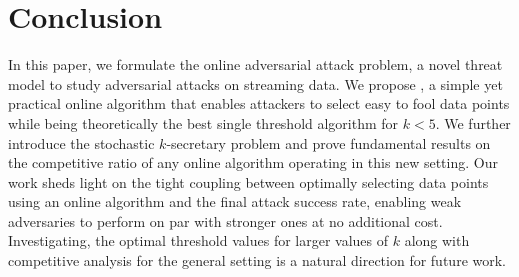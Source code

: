 \section{Conclusion}
In this paper, we formulate the online adversarial attack problem, a novel threat model to study adversarial attacks on streaming data. We propose \algoname, a simple yet practical online algorithm that enables attackers to select easy to fool data points while being theoretically the best single threshold algorithm for $k<5$. We further introduce the stochastic $k$-secretary problem and prove fundamental results on the competitive ratio of any online algorithm operating in this new setting. Our work sheds light on the tight coupling between optimally selecting data points using an online algorithm and the final attack success rate, enabling weak adversaries to perform on par with stronger ones at no additional cost. Investigating, the optimal threshold values for larger values of $k$ along with competitive analysis for the general setting is a natural direction for future work.  
